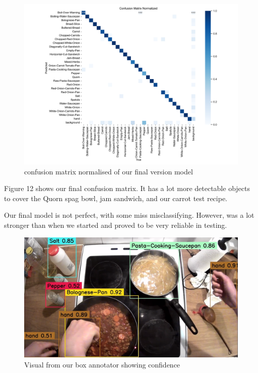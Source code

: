 \documentclass{article}
\begin{document}
\begin{figure}[h!]
  \centering
  \includegraphics[width=1\linewidth]{assets/confusion_matrix_normalized-Version-6.png}
  \caption{confusion matrix normalised of our final version model}
  \label{fig:enter-label}
\end{figure}

Figure 12 shows our final confusion matrix. It has a lot more detectable
objects to cover the Quorn spag bowl, jam sandwich, and our carrot test recipe.

Our final model is not perfect, with some miss misclassifying. However, was a
lot stronger than when we started and proved to be very reliable in testing.

\begin{figure}[h!]
  \centering
  \includegraphics[width=1\linewidth]{assets/BoxSelector-Chop-Chop.png}
  \caption{Visual from our box annotator showing confidence}
  \label{fig:enter-label}
\end{figure}
\end{document}
